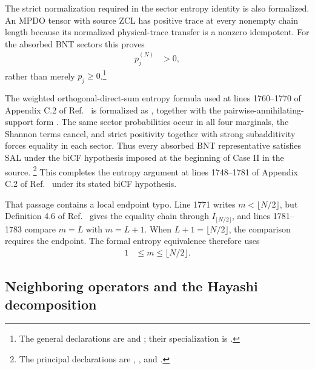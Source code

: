 \documentclass{article}
\begin{document}
The strict normalization required in the sector entropy identity is also
formalized. An MPDO tensor with source ZCL has positive trace at every
nonempty chain length because its normalized physical-trace transfer is a
nonzero idempotent. For the absorbed BNT sectors this proves
\begin{align}
    p_j^{(N)}
        &>0,
    \label{eq:cpgsv17_mpdo_sal_zcl_eta_local_structure_sector_probability_positive}
\end{align}
rather than merely $p_j\geq 0$.\footnote{The general declarations are
 and
; their specialization is
.}

The weighted orthogonal-direct-sum entropy formula used at lines 1760--1770 of
Appendix C.2 of Ref.~\cite{Cirac2016MPDO_arXiv} is formalized as
, together with the
pairwise-annihilating-support form
.
The same sector probabilities occur in all four marginals, the Shannon terms
cancel, and strict positivity together with strong subadditivity forces
equality in each sector. Thus every absorbed BNT representative satisfies SAL
under the biCF hypothesis imposed at the beginning of Case II in the source.
\footnote{The principal declarations are
,
, and
.}
This completes the entropy argument at lines 1748--1781 of Appendix C.2 of
Ref.~\cite{Cirac2016MPDO_arXiv} under its stated biCF hypothesis.

That passage contains a local endpoint typo. Line 1771 writes
$m<\lfloor N/2\rfloor$, but Definition 4.6 of
Ref.~\cite{Cirac2016MPDO_arXiv} gives the equality chain through
$I_{\lfloor N/2\rfloor}$, and lines 1781--1783 compare $m=L$ with $m=L+1$.
When $L+1=\lfloor N/2\rfloor$, the comparison requires the endpoint. The
formal entropy equivalence therefore uses
\begin{align}
    1
        &\leq m
        \leq \lfloor N/2\rfloor.
    \label{eq:cpgsv17_mpdo_sal_zcl_eta_local_structure_entropy_endpoint_range}
\end{align}

\subsection{Neighboring operators and the Hayashi decomposition}
\end{document}
